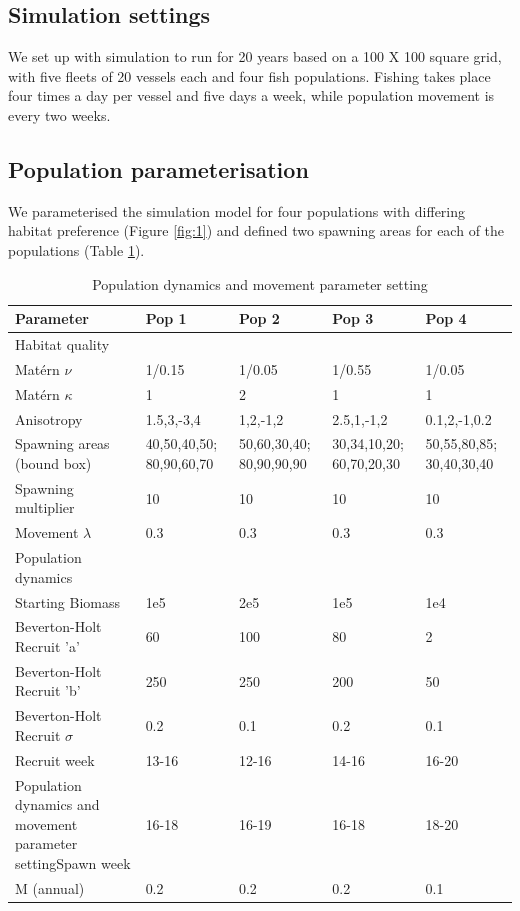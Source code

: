 \documentclass[review]{elsarticle}
\begin{document}
\subsection{Simulation settings}

We set up with simulation to run for 20 years based on a 100 X 100 square grid,
with five fleets of 20 vessels each and four fish populations. Fishing takes
place four times a day per vessel and five days a week, while population
movement is every two weeks. \\ 

\subsection{Population parameterisation}

We parameterised the simulation model for four populations with differing
habitat preference (Figure \ref{fig:1}) and defined two spawning areas for each
of the populations (Table \ref{tab:1}). \\

\begin{table}[!ht]
\caption{Population dynamics and movement parameter setting}
	\begin{tabular}{ p{4cm } p{2cm} p{2cm} p{2cm} p{2cm}}
	Parameter & Pop 1 & Pop 2 & Pop 3 & Pop 4 \\
	\hline
	Habitat quality & & & \\
	\hline
	Matérn $\nu$ & 1/0.15 & 1/0.05 & 1/0.55 & 1/0.05  \\
	Matérn $\kappa$ & 1 & 2 & 1 & 1  \\
	Anisotropy & 1.5,3,-3,4 & 1,2,-1,2 & 2.5,1,-1,2 & 0.1,2,-1,0.2 \\
	Spawning areas (bound box) & 40,50,40,50; 80,90,60,70 &
	50,60,30,40; 80,90,90,90 & 30,34,10,20; 60,70,20,30 & 50,55,80,85; 30,40,30,40 \\
	Spawning multiplier & 10 & 10 & 10 & 10 \\
	Movement $\lambda$ & 0.3 & 0.3 & 0.3 & 0.3 \\
	\hline
	Population dynamics & & & & \\
	\hline
	Starting Biomass & 1e5 & 2e5 & 1e5 & 1e4 \\
	Beverton-Holt Recruit 'a' & 60 & 100 & 80 & 2 \\
	Beverton-Holt Recruit 'b' & 250 & 250 & 200 & 50 \\
	Beverton-Holt Recruit $\sigma$ & 0.2 & 0.1 & 0.2 & 0.1 \\
	Recruit week & 13-16 & 12-16 & 14-16 & 16-20 \\
	Population dynamics and movement parameter settingSpawn week & 16-18 & 16-19 & 16-18 & 18-20 \\
	M (annual) & 0.2 & 0.2 & 0.2 & 0.1 \\
	\hline
\end{tabular}
\label{tab:1}
\end{table}
\end{document}
